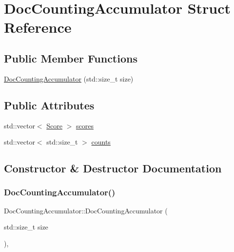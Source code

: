 \hypertarget{structDocCountingAccumulator}{}\section{Doc\+Counting\+Accumulator Struct Reference}
\label{structDocCountingAccumulator}
\subsection*{Public Member Functions}
\begin{DoxyCompactItemize}
\item 
\mbox{\hyperlink{structDocCountingAccumulator_a7b231899fb3d6b5dec9fcc4f595bd34d}{Doc\+Counting\+Accumulator}} (std\+::size\+\_\+t size)
\end{DoxyCompactItemize}
\subsection*{Public Attributes}
\begin{DoxyCompactItemize}
\item 
std\+::vector$<$ \mbox{\hyperlink{structbloodhound_1_1Score}{Score}} $>$ \mbox{\hyperlink{structDocCountingAccumulator_a456d654fee187beb12d802ab7d48fb15}{scores}}
\item 
std\+::vector$<$ std\+::size\+\_\+t $>$ \mbox{\hyperlink{structDocCountingAccumulator_a51342bf3c7bbe0d36de35762064ed580}{counts}}
\end{DoxyCompactItemize}


\subsection{Constructor \& Destructor Documentation}
\mbox{\label{structDocCountingAccumulator_a7b231899fb3d6b5dec9fcc4f595bd34d}} 
\subsubsection{\texorpdfstring{Doc\+Counting\+Accumulator()}{DocCountingAccumulator()}}
{\footnotesize\ttfamily Doc\+Counting\+Accumulator\+::\+Doc\+Counting\+Accumulator (\begin{DoxyParamCaption}\item[{std\+::size\+\_\+t}]{size }\end{DoxyParamCaption})\hspace{0.3cm}{\ttfamily [inline]}, {\ttfamily [explicit]}}



